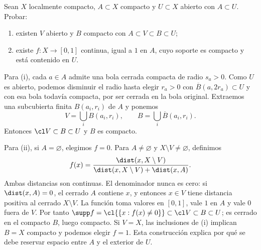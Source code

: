 \begin{ejercicio}\label{ej:lectura-15-5}
Sean $X$ localmente compacto, $A\subset X$ compacto y $U\subset X$ abierto con $A\subset U$. Probar:
\begin{enumerate}[label=(\roman*)]
\item existen $V$ abierto y $B$ compacto con $A\subset V\subset B\subset U$;
\item existe $f:X\to[0,1]$ continua, igual a $1$ en $A$, cuyo soporte es compacto y está contenido en $U$.
\end{enumerate}
\end{ejercicio}
\begin{solucion}
Para (i), cada $a\in A$ admite una bola cerrada compacta de radio $s_a>0$. Como $U$ es abierto, podemos disminuir el radio hasta elegir $r_a>0$ con $\overline B(a,2r_a)\subset U$ y con esa bola todavía compacta, por ser cerrada en la bola original. Extraemos una subcubierta finita $B(a_i,r_i)$ de $A$ y ponemos
\[
V=\bigcup_iB(a_i,r_i),\qquad B=\bigcup_i\overline B(a_i,r_i).
\]
Entonces $\cl V\subset B\subset U$ y $B$ es compacto.

Para (ii), si $A=\varnothing$, elegimos $f=0$. Para $A\ne\varnothing$ y $X\setminus V\ne\varnothing$, definimos
\[
f(x)=\frac{\dist(x,X\setminus V)}{\dist(x,X\setminus V)+\dist(x,A)}.
\]
Ambas distancias son continuas. El denominador nunca es cero: si $\dist(x,A)=0$, el cerrado $A$ contiene $x$, y entonces $x\in V$ tiene distancia positiva al cerrado $X\setminus V$. La función toma valores en $[0,1]$, vale $1$ en $A$ y vale $0$ fuera de $V$. Por tanto $\supp f=\cl{\{x:f(x)\ne0\}}\subset\cl V\subset B\subset U$; es cerrado en el compacto $B$, luego compacto. Si $V=X$, las inclusiones de (i) implican $B=X$ compacto y podemos elegir $f=1$. Esta construcción explica por qué se debe reservar espacio entre $A$ y el exterior de $U$.
\end{solucion}

